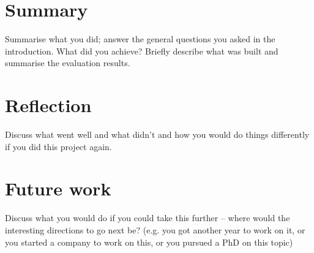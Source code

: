 \documentclass{l4proj}
\begin{document}
\section{Summary}
Summarise what you did; answer the general questions you asked in the introduction. What did you achieve? Briefly describe what was built and summarise the evaluation results.

\section{Reflection}
Discuss what went well and what didn't and how you would do things differently if you did this project again.

\section{Future work}
Discuss what you would do if you could take this further -- where would the interesting directions to go next be? (e.g. you got another year to work on it, or you started a company to work on this, or you pursued a PhD on this topic)

%
% 
\end{document}

